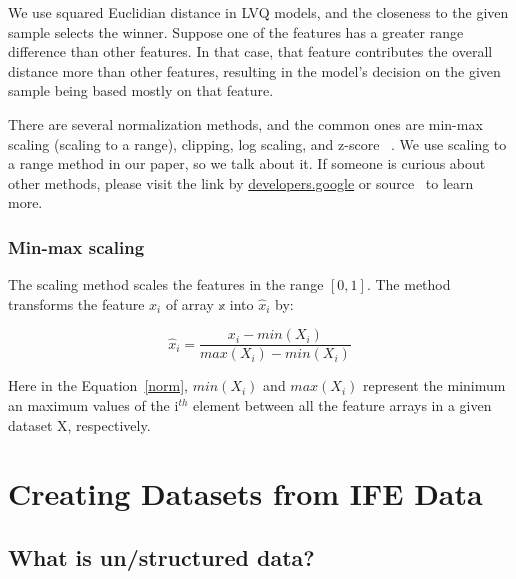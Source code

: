We use squared Euclidian distance in LVQ models, and the closeness to the given sample selects the winner. Suppose one of the features has a greater range difference than other features. In that case, that feature contributes the overall distance more than other features, resulting in the model’s decision on the given sample being based mostly on that feature.

There are several normalization methods, and the common ones are min-max scaling (scaling to a range), clipping, log scaling, and z-score ~\cite{googledev}. We use scaling to a range method in our paper, so we talk about it. If someone is curious about other methods, please visit the link by \href{https://developers.google.com/machine-learning/data-prep/transform/normalization}{developers.google} or source~\cite{googledev} to learn more.

\subsubsection{Min-max scaling}
The scaling method scales the features in the range $[0,1]$. The method transforms the feature $x_{i}$ of array $\mathbb{x}$ into $\hat{x}_{i}$ by:
\vspace{10pt}


\begin{equation}
\hat{x}_{i}= \frac{x_{i} - min(X_{i})}{max(X_{i}) - min(X_{i})}\label{norm}
\end{equation}
\vspace{10pt}

Here in the Equation~\eqref{norm}, $min(X_{i})$ and $max(X_{i})$ represent the minimum an maximum values of the i$^{th}$ element between all the feature arrays in a given dataset X, respectively.

\section{Creating Datasets from IFE Data}\label{creIFE}

\subsection{What is un/structured data?}

